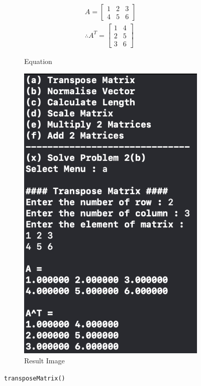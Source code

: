 \begin{figure}[h]
    \centering
    \begin{subfigure}[b]{0.55\textwidth}
        \centering
        \begin {align*}
        A = \begin{bmatrix}
            1&2&3\\4&5&6
        \end{bmatrix}\\
        \therefore A^T = \begin{bmatrix}
            1&4\\2&5\\3&6
        \end{bmatrix}
        \end {align*}
        \caption{Equation}
        \label{fig:equation}
    \end{subfigure}
    \hfill
    \begin{subfigure}[b]{0.35\textwidth}
        \centering
        \includegraphics[width=\textwidth]{img/prj0/a.png}
        \caption{Result Image}
        \label{fig:image}
    \end{subfigure}
    \caption{\texttt{transposeMatrix()}}
\end{figure}
\pagebreak


